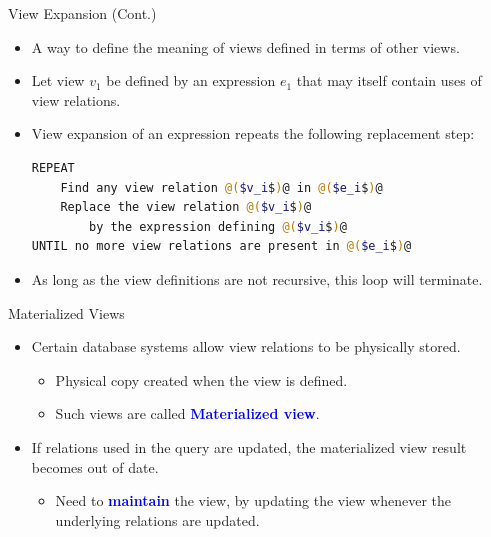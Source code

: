 \documentclass{beamer}
\begin{document}
\begin{frame}[fragile]{View Expansion (Cont.)}
    \begin{itemize}
        \item A way to define the meaning of views defined in terms of other views.
        \item Let view $v_1$ be defined by an expression $e_1$ that may itself contain uses of view relations.
        \item View expansion of an expression repeats the following replacement step:
            \footnotesize
            \begin{lstlisting}[language=bash]
REPEAT
    Find any view relation @($v_i$)@ in @($e_i$)@
    Replace the view relation @($v_i$)@
        by the expression defining @($v_i$)@
UNTIL no more view relations are present in @($e_i$)@
            \end{lstlisting}
            \normalsize
        \item As long as the view definitions are not recursive, this loop will terminate.
    \end{itemize}
\end{frame}

\begin{frame}{Materialized Views}
    \begin{itemize}
        \item Certain database systems allow view relations to be physically stored.
            \begin{itemize}
                \item Physical copy created when the view is defined.
                \item Such views are called \textbf{\textcolor{blue}{Materialized view}}.
            \end{itemize}
        \item If relations used in the query are updated, the materialized view result becomes out of date.
            \begin{itemize}
                \item Need to \textcolor{blue}{\textbf{maintain}} the view, by updating the view whenever the underlying relations are updated.
            \end{itemize}
    \end{itemize}
\end{frame}
\end{document}
